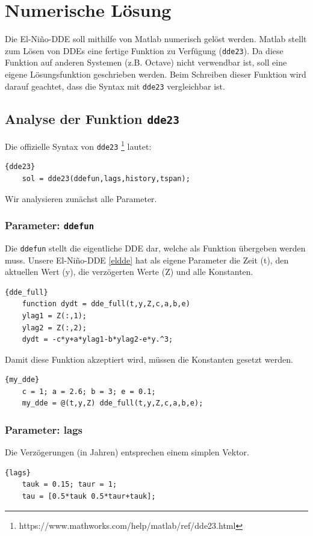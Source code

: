 \section{Numerische Lösung}

Die El-Niño-DDE soll mithilfe von Matlab numerisch gelöst werden.
Matlab stellt zum Lösen von DDEs eine fertige Funktion zu Verfügung (\texttt{dde23}).
Da diese Funktion auf anderen Systemen (z.B. Octave) nicht verwendbar ist, soll eine eigene Lösungsfunktion geschrieben werden.
Beim Schreiben dieser Funktion wird darauf geachtet, dass die Syntax mit \texttt{dde23} vergleichbar ist. 

\subsection{Analyse der Funktion \texttt{dde23}}
Die offizielle Syntax von \texttt{dde23} \footnote{https://www.mathworks.com/help/matlab/ref/dde23.html} lautet: 
\begin{lstlisting}[style=MATLAB]{dde23}
	sol = dde23(ddefun,lags,history,tspan);
\end{lstlisting}
Wir analysieren zunächst alle Parameter.

\subsubsection{Parameter: \texttt{ddefun}}
Die \texttt{ddefun} stellt die eigentliche DDE dar, welche als Funktion übergeben werden muss.
Unsere El-Niño-DDE \eqref{eldde} hat als eigene Parameter die Zeit (t), den aktuellen Wert (y), die verzögerten Werte (Z) und alle Konstanten.
\begin{lstlisting}[style=MATLAB]{dde_full}
	function dydt = dde_full(t,y,Z,c,a,b,e)
	ylag1 = Z(:,1);
	ylag2 = Z(:,2);
	dydt = -c*y+a*ylag1-b*ylag2-e*y.^3;
\end{lstlisting}
Damit diese Funktion akzeptiert wird, müssen die Konstanten gesetzt werden.
\begin{lstlisting}[style=MATLAB]{my_dde}
	c = 1; a = 2.6; b = 3; e = 0.1;
	my_dde = @(t,y,Z) dde_full(t,y,Z,c,a,b,e);
\end{lstlisting}

\subsubsection{Parameter: lags}
Die Verzögerungen (in Jahren) entsprechen einem simplen Vektor.
\begin{lstlisting}[style=MATLAB]{lags}
	tauk = 0.15; taur = 1;
	tau = [0.5*tauk 0.5*taur+tauk];
\end{lstlisting}

